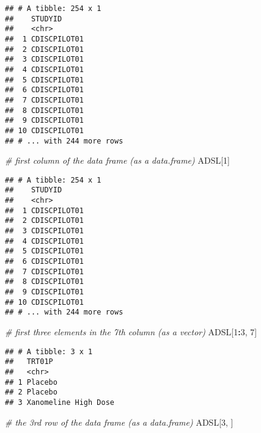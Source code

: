 \documentclass[]{book}
\newenvironment{Shaded}{\begin{snugshade}}{\end{snugshade}}
\newcommand{\CommentTok}[1]{\textcolor[rgb]{0.56,0.35,0.01}{\textit{#1}}}
\newcommand{\DecValTok}[1]{\textcolor[rgb]{0.00,0.00,0.81}{#1}}
\newcommand{\NormalTok}[1]{#1}
\newcommand{\OperatorTok}[1]{\textcolor[rgb]{0.81,0.36,0.00}{\textbf{#1}}}
\begin{document}
\begin{verbatim}
## # A tibble: 254 x 1
##    STUDYID     
##    <chr>       
##  1 CDISCPILOT01
##  2 CDISCPILOT01
##  3 CDISCPILOT01
##  4 CDISCPILOT01
##  5 CDISCPILOT01
##  6 CDISCPILOT01
##  7 CDISCPILOT01
##  8 CDISCPILOT01
##  9 CDISCPILOT01
## 10 CDISCPILOT01
## # ... with 244 more rows
\end{verbatim}

\begin{Shaded}
\begin{Highlighting}[]
\CommentTok{# first column of the data frame (as a data.frame)}
\NormalTok{ADSL[}\DecValTok{1}\NormalTok{]    }
\end{Highlighting}
\end{Shaded}

\begin{verbatim}
## # A tibble: 254 x 1
##    STUDYID     
##    <chr>       
##  1 CDISCPILOT01
##  2 CDISCPILOT01
##  3 CDISCPILOT01
##  4 CDISCPILOT01
##  5 CDISCPILOT01
##  6 CDISCPILOT01
##  7 CDISCPILOT01
##  8 CDISCPILOT01
##  9 CDISCPILOT01
## 10 CDISCPILOT01
## # ... with 244 more rows
\end{verbatim}

\begin{Shaded}
\begin{Highlighting}[]
\CommentTok{# first three elements in the 7th column (as a vector)}
\NormalTok{ADSL[}\DecValTok{1}\OperatorTok{:}\DecValTok{3}\NormalTok{, }\DecValTok{7}\NormalTok{] }
\end{Highlighting}
\end{Shaded}

\begin{verbatim}
## # A tibble: 3 x 1
##   TRT01P              
##   <chr>               
## 1 Placebo             
## 2 Placebo             
## 3 Xanomeline High Dose
\end{verbatim}

\begin{Shaded}
\begin{Highlighting}[]
\CommentTok{# the 3rd row of the data frame (as a data.frame)}
\NormalTok{ADSL[}\DecValTok{3}\NormalTok{, ]}
\end{Highlighting}
\end{Shaded}
\end{document}
